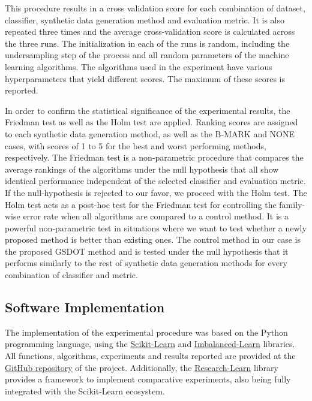 \documentclass[10pt,letterpaper]{article}
\begin{document}
This procedure results in a cross validation score for each combination of dataset, classifier, synthetic data generation method and evaluation metric. It is also repeated three times and the average cross-validation score is calculated across the three runs. The initialization in each of the runs is random, including the undersampling step of the process and all random parameters of the machine learning algorithms. The algorithms used in the experiment have various hyperparameters that yield different scores. The maximum of these scores is reported.

In order to confirm the statistical significance of the experimental results, the Friedman test as well as the Holm test \cite{JanezDemsar.2006} are applied. Ranking scores are assigned to each synthetic data generation method, as well as the B-MARK and NONE cases, with scores of 1 to 5 for the best and worst performing methods, respectively. The Friedman test is a non-parametric procedure that compares the average rankings of the algorithms under the null hypothesis that all show identical performance independent of the selected classifier and evaluation metric. If the null-hypothesis is rejected to our favor, we proceed with the Holm test. The Holm test acts as a post-hoc test for the Friedman test for controlling the family-wise error rate when all algorithms are compared to a control method. It is a powerful non-parametric test in situations where we want to test whether a newly proposed method is better than existing ones. The control method in our case is the proposed GSDOT method and is tested under the null hypothesis that it performs similarly to the rest of synthetic data generation methods for every combination of classifier and metric.

\subsection{Software Implementation}

The implementation of the experimental procedure was based on the Python
programming language, using the \href{https://scikit-learn.org/stable/}{Scikit-Learn} \cite{Pedregosa.2011} and \href{https://imbalanced-learn.org/en/stable/}{Imbalanced-Learn} \cite{Lemaitre.2017} libraries. All functions, algorithms, experiments and results reported are provided at the \href{https://github.com/AlgoWit/publications/tree/master/small-data-oversampling}{GitHub repository} of the project. Additionally, the \href{https://research-learn.readthedocs.io/en/latest/?badge=latest}{Research-Learn} library provides a framework to implement comparative experiments, also being fully integrated with the Scikit-Learn ecosystem.
\end{document}
